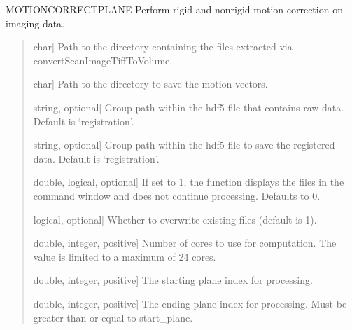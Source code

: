 \documentclass[letterpaper,10pt,english]{sphinxmanual}
\begin{document}
\begin{fulllineitems}
\label{\detokenize{api/core:motionCorrectPlane}}
\pysigstartsignatures
{}
\pysigstopsignatures
\sphinxAtStartPar
MOTIONCORRECTPLANE Perform rigid and non\sphinxhyphen{}rigid motion correction on imaging data.
\begin{quote}\begin{description}
\begin{description}
\sphinxlineitem{\sphinxstylestrong{data\_path}}{[}char{]}
\sphinxAtStartPar
Path to the directory containing the files extracted via convertScanImageTiffToVolume.

\sphinxlineitem{\sphinxstylestrong{save\_path}}{[}char{]}
\sphinxAtStartPar
Path to the directory to save the motion vectors.

\sphinxlineitem{\sphinxstylestrong{data\_input\_group}}{[}string, optional{]}
\sphinxAtStartPar
Group path within the hdf5 file that contains raw data.
Default is ‘registration’.

\sphinxlineitem{\sphinxstylestrong{data\_output\_group}}{[}string, optional{]}
\sphinxAtStartPar
Group path within the hdf5 file to save the registered data.
Default is ‘registration’.

\sphinxlineitem{\sphinxstylestrong{debug\_flag}}{[}double, logical, optional{]}
\sphinxAtStartPar
If set to 1, the function displays the files in the command window and does
not continue processing. Defaults to 0.

\sphinxlineitem{\sphinxstylestrong{overwrite}}{[}logical, optional{]}
\sphinxAtStartPar
Whether to overwrite existing files (default is 1).

\sphinxlineitem{\sphinxstylestrong{num\_cores}}{[}double, integer, positive{]}
\sphinxAtStartPar
Number of cores to use for computation. The value is limited to a maximum
of 24 cores.

\sphinxlineitem{\sphinxstylestrong{start\_plane}}{[}double, integer, positive{]}
\sphinxAtStartPar
The starting plane index for processing.

\sphinxlineitem{\sphinxstylestrong{end\_plane}}{[}double, integer, positive{]}
\sphinxAtStartPar
The ending plane index for processing. Must be greater than or equal to
start\_plane.

\end{description}


\end{description}
\end{quote}
\end{fulllineitems}
\end{document}
